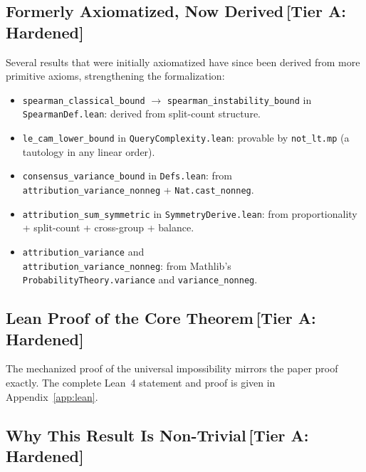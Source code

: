 \documentclass[11pt,a4paper]{article}
\begin{document}
\subsection{Formerly Axiomatized, Now Derived\,\textnormal{\normalsize[Tier A: Hardened]}}

Several results that were initially axiomatized have since been derived from
more primitive axioms, strengthening the formalization:

\begin{itemize}
  \item \texttt{spearman\_classical\_bound} $\to$
    \texttt{spearman\_instability\_bound} in \texttt{SpearmanDef.lean}:
    derived from split-count structure.
  \item \texttt{le\_cam\_lower\_bound} in \texttt{QueryComplexity.lean}:
    provable by \texttt{not\_lt.mp} (a tautology in any linear order).
  \item \texttt{consensus\_variance\_bound} in
    \texttt{Defs.lean}: from\\
    \texttt{attribution\_variance\_nonneg} +
    \texttt{Nat.cast\_nonneg}.
  \item \texttt{attribution\_sum\_symmetric} in
    \texttt{SymmetryDerive.lean}: from proportionality +
    split-count + cross-group + balance.
  \item \texttt{attribution\_variance} and\\
    \texttt{attribution\_variance\_nonneg}: from Mathlib's\\
    \texttt{ProbabilityTheory.variance} and
    \texttt{variance\_nonneg}.
\end{itemize}

\subsection{Lean Proof of the Core Theorem\,\textnormal{\normalsize[Tier A: Hardened]}}

The mechanized proof of the universal impossibility mirrors the paper proof
exactly.  The complete Lean~4 statement and proof is given in
Appendix~\ref{app:lean}.

\subsection{Why This Result Is Non-Trivial\,\textnormal{\normalsize[Tier A: Hardened]}}
\label{sec:non-trivial}
\end{document}

